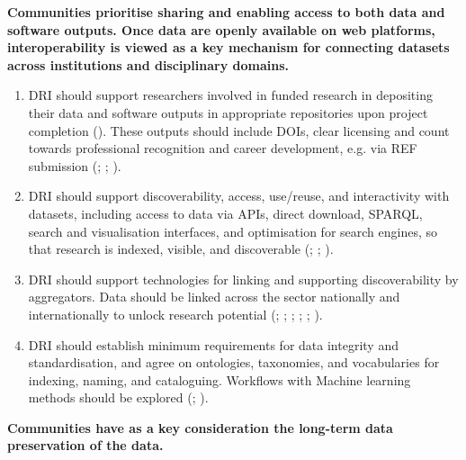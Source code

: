 \documentclass[11pt]{scrartcl}
\begin{document}
\noindent\textbf{Communities prioritise sharing and enabling access to both data and software outputs. Once data are openly available on web platforms, interoperability is viewed as a key mechanism for connecting datasets across institutions and disciplinary domains.}

\begin{enumerate}[resume]
\item DRI should support researchers involved in funded research in depositing their data and software outputs in appropriate repositories upon project completion (\cite[92]{taylor_2022_10518740}). These outputs should include DOIs, clear licensing and count towards professional recognition and career development, e.g. via REF submission (\cite[38]{taylor_2022_10518740}; \cite[7]{hawkins_2024_14006955}; \cite[8]{duran_del_fierro_2025_17641455}).

\item\label{itm:dis} DRI should support discoverability, access, use/reuse, and interactivity with datasets, including access to data via APIs, direct download, SPARQL, search and visualisation interfaces, and optimisation for search engines, so that research is indexed, visible, and discoverable 
(\cite[12,18]{de_roure_2022_4716148}; \cite{Rodriguez22}; \cite[5]{wrro203045}).  

\item\label{itm:agg} DRI should support technologies for linking and supporting discoverability by aggregators. Data should be linked across the sector nationally and internationally to unlock research potential (\cite[11]{de_roure_2022_4716148}; \cite{Rodriguez22}; \cite[9,11]{Black19102024}; \cite[30]{taylor_2022_10518740}; \cite[5,20]{Zwiggelaar22}; \cite[14]{hawkins_2024_14006955}).   

\item\label{itm:ont} DRI should establish minimum requirements for data integrity and standardisation, and agree on ontologies, taxonomies, and vocabularies for indexing, naming, and cataloguing. Workflows with Machine learning methods should be explored (\cite[53]{de_roure_2022_4716148}; \cite[14]{hawkins_2024_14006955}). 
\end{enumerate}

\noindent\textbf{Communities have as a key consideration the long-term data preservation of the data.}
\end{document}
